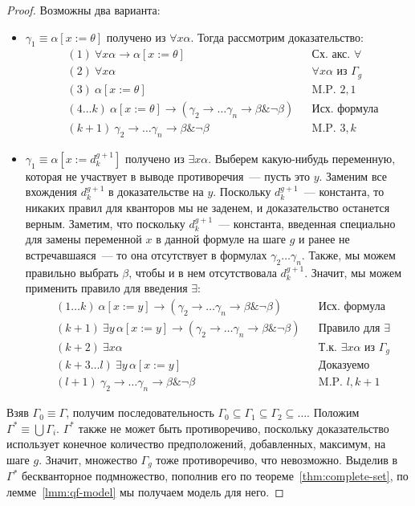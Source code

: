 \documentclass[a4paper,11pt]{article}
\theoremstyle{definition}
\newcommand{\amp}{\mathbin{\&}}
\begin{document}
\begin{proof}
Возможны два варианта:
\begin{itemize}
\item $\gamma_1 \equiv \alpha[x := \theta]$ получено из $\forall x\alpha$. Тогда
  рассмотрим доказательство:
  \begin{align*}
  &(1)\ \forall x\alpha \to \alpha[x := \theta] &&\text{Сх. акс. } \forall\\
  &(2)\ \forall x\alpha &&\forall x\alpha \text{ из } \Gamma_g\\
  &(3)\ \alpha[x := \theta] &&\text{M.P. } 2, 1\\
  &(4\dots k)\ \alpha[x := \theta] \to (\gamma_2 \to \dots \gamma_n \to \beta \amp \neg\beta) &&\text{Исх. формула}\\
  &(k+1)\ \gamma_2 \to \dots \gamma_n \to \beta \amp \neg\beta &&\text{M.P. } 3, k
  \end{align*}
\item $\gamma_1 \equiv \alpha[x := d^{g+1}_k]$ получено из $\exists x\alpha$.
  Выберем какую-нибудь переменную, которая не участвует в выводе противоречия~---
  пусть это $y$. Заменим все вхождения $d^{g+1}_k$ в доказательстве на $y$.
  Поскольку $d^{g+1}_k$~--- константа, то никаких правил для кванторов мы не
  заденем, и доказательство останется верным. Заметим, что поскольку
  $d^{g+1}_k$~--- константа, введенная специально для замены переменной $x$ в
  данной формуле на шаге $g$ и ранее не встречавшаяся~--- то она отсутствует в
  формулах $\gamma_2 \dots \gamma_n$. Также, мы можем правильно выбрать $\beta$,
  чтобы и в нем отсутствовала $d^{g+1}_k$. Значит, мы можем применить правило
  для введения $\exists$:
  \begin{align*}
  &(1\dots k)\ \alpha[x := y] \to (\gamma_2 \to \dots \gamma_n \to \beta \amp \neg\beta) &&\text{Исх. формула}\\
  &(k+1)\ \exists y\,\alpha[x := y] \to (\gamma_2 \to \dots \gamma_n \to \beta \amp \neg\beta) &&\text{Правило для } \exists\\
  &(k+2)\ \exists x\alpha &&\text{Т.к. } \exists x\alpha \text{ из } \Gamma_g\\
  &(k+3\dots l)\ \exists y\,\alpha[x := y] &&\text{Доказуемо}\\
  &(l+1)\ \gamma_2 \to \dots \gamma_n \to \beta \amp \neg\beta &&\text{M.P. } l, k+1
  \end{align*}
\end{itemize}

Взяв $\Gamma_0 \equiv \Gamma$, получим последовательность $\Gamma_0 \subseteq
\Gamma_1 \subseteq \Gamma_2 \subseteq \dots$. Положим $\Gamma^* \equiv \bigcup
\Gamma_i$. $\Gamma^*$ также не может быть противоречиво, поскольку доказательство
использует конечное количество предположений, добавленных, максимум, на шаге
$g$. Значит, множество $\Gamma_g$ тоже противоречиво, что невозможно. Выделив в
$\Gamma^*$ бескванторное подмножество, пополнив его по теореме~\ref{thm:complete-set},
по лемме~\ref{lmm:qf-model} мы получаем модель для него.


\end{proof}
\end{document}
